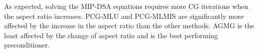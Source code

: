 As expected, solving the MIP-DSA equations requires more CG iterations when the aspect
ratio increases. PCG-MLU and PCG-MLMIS are significantly more affected by the
increase in the aspect ratio than the other methods. AGMG is the least
affected by the change of aspect ratio and is the best performing
preconditioner.
